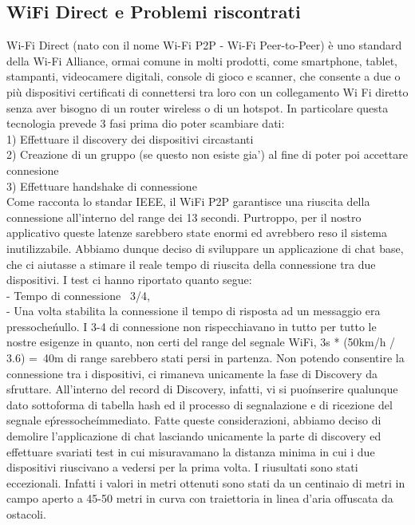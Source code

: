 \documentclass[conference]{IEEEtran}
\begin{document}
\subsection{WiFi Direct e Problemi riscontrati}
Wi-Fi Direct (nato con il nome Wi-Fi P2P - Wi-Fi Peer-to-Peer) è uno standard della Wi-Fi Alliance, ormai comune in molti prodotti, come smartphone, tablet, stampanti, videocamere digitali, console di gioco e scanner, che consente a due o più dispositivi certificati di connettersi tra loro con un collegamento Wi Fi diretto senza aver bisogno di un router wireless o di un hotspot.
In particolare questa tecnologia prevede 3 fasi prima dio poter scambiare dati:
\\
1) Effettuare il discovery dei dispositivi circastanti
\\
2) Creazione di un gruppo (se questo non esiste gia') al fine di poter poi accettare connesione
\\
3) Effettuare handshake di connessione
\\
Come racconta lo standar IEEE, il WiFi P2P garantisce una riuscita della connessione all'interno del range dei 13 secondi. Purtroppo, per il nostro applicativo queste latenze sarebbero state enormi ed avrebbero reso il sistema inutilizzabile.
Abbiamo dunque deciso di sviluppare un applicazione di chat base, che ci aiutasse a stimare il reale tempo di riuscita della connessione tra due dispositivi.
I test ci hanno riportato quanto segue:
\\
- Tempo di connessione ~3/4,\\
- Una volta stabilita la connessione il tempo di risposta ad un messaggio era pressoche\' nullo.
I 3-4 di connessione non rispecchiavano in tutto per tutto le nostre esigenze in quanto, non certi del range del segnale WiFi, 3s * (50km/h / 3.6) =~40m di range sarebbero stati persi in partenza.
Non potendo consentire la connessione tra i dispositivi, ci rimaneva unicamente la fase di Discovery da sfruttare.
All'interno del record di Discovery, infatti, vi si puo\' inserire qualunque dato sottoforma di tabella hash ed il processo di segnalazione e di ricezione del segnale e\' pressoche\' immediato.
Fatte queste considerazioni, abbiamo deciso di demolire l'applicazione di chat lasciando unicamente la parte di discovery ed effettuare svariati test in cui misuravamano la distanza minima in cui i due dispositivi riuscivano a vedersi per la prima volta.
I riusultati sono stati eccezionali. Infatti i valori in metri ottenuti sono stati da un centinaio di metri in campo aperto a 45-50 metri in curva con traiettoria in linea d'aria offuscata da ostacoli.
\end{document}
